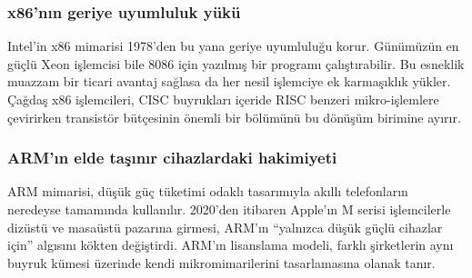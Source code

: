 \subsubsection*{x86'nın geriye uyumluluk yükü}
Intel'in x86 mimarisi 1978'den bu yana geriye uyumluluğu korur. Günümüzün en güçlü Xeon işlemcisi bile 8086 için yazılmış bir programı çalıştırabilir. Bu esneklik muazzam bir ticari avantaj sağlasa da her nesil işlemciye ek karmaşıklık yükler. Çağdaş x86 işlemcileri, CISC buyrukları içeride RISC benzeri mikro-işlemlere çevirirken transistör bütçesinin önemli bir bölümünü bu dönüşüm birimine ayırır.

\subsubsection*{ARM'ın elde taşınır cihazlardaki hakimiyeti}
ARM mimarisi, düşük güç tüketimi odaklı tasarımıyla akıllı telefonların neredeyse tamamında kullanılır. 2020'den itibaren Apple'ın M serisi işlemcilerle dizüstü ve masaüstü pazarına girmesi, ARM'ın ``yalnızca düşük güçlü cihazlar için'' algısını kökten değiştirdi. ARM'ın lisanslama modeli, farklı şirketlerin aynı buyruk kümesi üzerinde kendi mikromimarilerini tasarlamasına olanak tanır.

